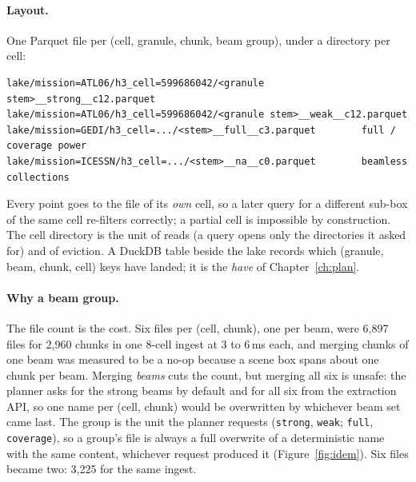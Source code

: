 \documentclass[10pt,a4paper]{article}
\newcommand{\code}[1]{\texttt{#1}}
\begin{document}
\paragraph{Layout.} One Parquet file per (cell, granule, chunk, beam group), under a directory per cell:
\begin{Verbatim}[fontsize=\footnotesize]
lake/mission=ATL06/h3_cell=599686042/<granule stem>__strong__c12.parquet
lake/mission=ATL06/h3_cell=599686042/<granule stem>__weak__c12.parquet
lake/mission=GEDI/h3_cell=.../<stem>__full__c3.parquet        full / coverage power
lake/mission=ICESSN/h3_cell=.../<stem>__na__c0.parquet        beamless collections
\end{Verbatim}
Every point goes to the file of its \emph{own} cell, so a later query for a different sub-box of the same cell
re-filters correctly; a partial cell is impossible by construction. The cell directory is the unit of reads
(a query opens only the directories it asked for) and of eviction. A DuckDB table beside the lake records which
(granule, beam, chunk, cell) keys have landed; it is the \emph{have} of Chapter~\ref{ch:plan}.

\paragraph{Why a beam group.} The file count is the cost. Six files per (cell, chunk), one per beam, were 6{,}897
files for 2{,}960 chunks in one 8-cell ingest at 3 to 6\,ms each, and merging chunks of one beam was measured to be a
no-op because a scene box spans about one chunk per beam. Merging \emph{beams} cuts the count, but merging all six
is unsafe: the planner asks for the strong beams by default and for all six from the extraction API, so one name
per (cell, chunk) would be overwritten by whichever beam set came last. The group is the unit the planner requests
(\code{strong}, \code{weak}; \code{full}, \code{coverage}), so a group's file is always a full overwrite of a
deterministic name with the same content, whichever request produced it (Figure~\ref{fig:idem}). Six files became
two: 3{,}225 for the same ingest.
\end{document}
